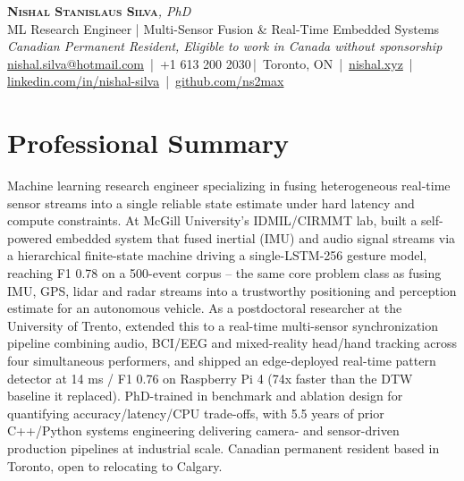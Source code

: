 \documentclass[11pt]{article}
\makeatletter
\newcommand{\cvName}{Nishal Stanislaus Silva}
\newcommand{\cvEmail}{nishal.silva@hotmail.com}
\newcommand{\cvPhone}{+1 613 200 2030}
\newcommand{\cvCity}{Toronto, ON}
\newcommand{\cvSite}{https://nishal.xyz}
\newcommand{\cvLinkedIn}{https://www.linkedin.com/in/nishal-silva}
\newcommand{\cvGitHub}{https://github.com/ns2max}
\newcommand{\cvStatus}{Canadian Permanent Resident, Eligible to work in Canada without sponsorship}
\newcommand{\cvTagline}{ML Research Engineer | Multi-Sensor Fusion \& Real-Time Embedded Systems}
\makeatother
\begin{document}
\pagestyle{empty}
\begin{center}
    {\LARGE \scshape \textbf{\cvName}}{\large \textit{, PhD}}\\[1pt]
    {\small \cvTagline}\\[1pt]
    {\footnotesize\textit{\cvStatus}}\\[1pt]
    {\small
    \href{mailto:\cvEmail}{\cvEmail} \,|\, \cvPhone \,|\, \cvCity
    \,|\, \href{\cvSite}{nishal.xyz} \,|\, \href{\cvLinkedIn}{linkedin.com/in/nishal-silva}
    \,|\, \href{\cvGitHub}{github.com/ns2max}}
\end{center}

\section*{Professional Summary}
Machine learning research engineer specializing in fusing heterogeneous real-time sensor streams into a single reliable state estimate under hard latency and compute constraints. At McGill University's IDMIL/CIRMMT lab, built a self-powered embedded system that fused inertial (IMU) and audio signal streams via a hierarchical finite-state machine driving a single-LSTM-256 gesture model, reaching F1 0.78 on a 500-event corpus -- the same core problem class as fusing IMU, GPS, lidar and radar streams into a trustworthy positioning and perception estimate for an autonomous vehicle. As a postdoctoral researcher at the University of Trento, extended this to a real-time multi-sensor synchronization pipeline combining audio, BCI/EEG and mixed-reality head/hand tracking across four simultaneous performers, and shipped an edge-deployed real-time pattern detector at 14 ms / F1 0.76 on Raspberry Pi 4 (74x faster than the DTW baseline it replaced). PhD-trained in benchmark and ablation design for quantifying accuracy/latency/CPU trade-offs, with 5.5 years of prior C++/Python systems engineering delivering camera- and sensor-driven production pipelines at industrial scale. Canadian permanent resident based in Toronto, open to relocating to Calgary.
\end{document}

